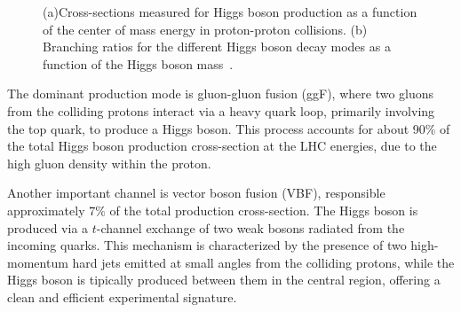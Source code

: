 \begin{figure}[htbp]
    \centering
    \hfill
    \caption{(a)Cross-sections measured for Higgs boson production as a function of the center of mass energy in proton-proton collisions. 
    (b) Branching ratios for the different Higgs boson decay modes as a function of the Higgs boson mass~\cite{Nature_ATLAS}.}
    \label{fig:higgs_comb}
\end{figure}


The dominant production mode is gluon-gluon fusion (ggF), where two gluons from the colliding protons interact via a heavy quark loop, primarily involving the top quark, to produce a Higgs boson. This process accounts for about 90\% of the total Higgs boson production cross-section at the LHC energies, due to the high gluon density within the proton.

Another important channel is vector boson fusion (VBF), responsible approximately $7\%$ of the total production cross-section. The Higgs boson is produced via a $t$-channel exchange of two weak bosons radiated from the incoming quarks. This mechanism is characterized by the presence of two high-momentum hard jets emitted at small angles from the colliding protons, while the Higgs boson is tipically produced between them in the central region, offering a clean and efficient experimental signature. 


